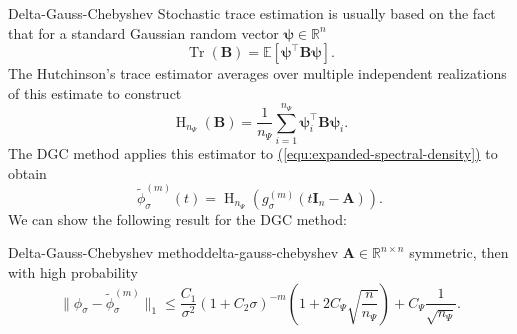 \documentclass[final, 12pt]{beamer}
\newcommand{\mtx}[1]{\boldsymbol{#1}}
\newcommand{\vct}[1]{\boldsymbol{#1}}
\DeclareMathOperator{\Tr}{Tr}
\DeclareMathOperator{\Hutch}{H}
\newcommand{\refequ}[1]{\hyperref[#1]{\textcolor{linkcolor}{(\ref*{#1})}}}
\begin{document}
\begin{frame}[t]

\vspace{15pt}
\begin{columns}[t]

    \begin{column}{0.3\paperwidth}

        \begin{block}{Delta-Gauss-Chebyshev}
            Stochastic trace estimation is usually based on the fact that
            for a standard Gaussian random vector $\vct{\psi} \in \mathbb{R}^n$
            \begin{equation}
                \Tr(\mtx{B}) = \mathbb{E}\left[\vct{\psi}^{\top} \mtx{B} \vct{\psi}\right].
            \end{equation}
            The Hutchinson's trace estimator averages over multiple independent
            realizations of this estimate to construct
            \begin{equation}
                \Hutch_{n_{\Psi}}(\mtx{B}) = \frac{1}{n_{\Psi}} \sum_{i=1}^{n_{\Psi}} \vct{\psi}_i^{\top} \mtx{B} \vct{\psi}_i.
            \end{equation}
            The \gls{DGC} method \cite{lin2017randomized} applies this
            estimator to \refequ{equ:expanded-spectral-density} to obtain
            \begin{equation}
                \boxed{\widetilde{\phi}_{\sigma}^{(m)}(t) = \Hutch_{n_{\Psi}}(g_{\sigma}^{(m)}(t\mtx{I}_n - \mtx{A})).}
            \end{equation}
            We can show the following result for the \gls{DGC} method:
            \begin{thm}{Delta-Gauss-Chebyshev method}{delta-gauss-chebyshev}
                $\mtx{A} \in \mathbb{R}^{n \times n}$ symmetric, then with high probability
                \begin{equation}
                    \lVert \phi_{\sigma} - \widetilde{\phi}_{\sigma}^{(m)}\rVert _1
                    \leq \frac{C_1}{\sigma^2} (1 + C_2 \sigma)^{-m} \left( 1 + 2 C_{\Psi} \sqrt{\frac{n}{n_{\Psi}}} \right) + C_{\Psi} \frac{1}{\sqrt{n_{\Psi}}}.
                \end{equation}
            \end{thm}
        \end{block}

    \end{column}


\end{columns}
\end{frame}
\end{document}
